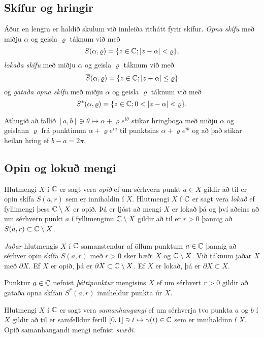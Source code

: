 \subsection*{Skífur og hringir}

Áður en lengra er haldið skulum við innleiða rithátt fyrir skífur.  
{\it Opna skífu} með miðju $\alpha$ og geisla
$\varrho$ táknum við með
$$ S(\alpha,\varrho)={\{z\in {\mathbb C}; |z-\alpha|<\varrho\}}, $$
{\it lokaða skífu} með miðju $\alpha$ og geisla 
$\varrho$ táknum við með
$$ \overline S(\alpha,\varrho)={\{z\in {\mathbb C}; |z-\alpha|\leq\varrho\}} $$
og {\it gataða opna skífu} með miðju $\alpha$ og
geisla $\varrho$ táknum við með
$$ S^*(\alpha,\varrho)=\set{z\in \C; 0<|z-\alpha|<\varrho}. $$


Athugið að fallið $[a,b]\ni \theta\mapsto \alpha+\varrho e^{i\theta}$ stikar
hringboga með miðju $\alpha$ og geislann $\varrho$ frá punktinum
$\alpha+\varrho e^{ia}$
til punktsins $\alpha+\varrho e^{ib}$ og að það stikar heilan hring ef 
$b-a=2\pi$.

\subsection*{Opin og lokuð mengi}

Hlutmengi $X$ í ${\mathbb C}$ er sagt vera {\it opið} ef um sérhvern punkt $a\in X$
gildir að til er opin skífa $S(a,r)$ sem er innihaldin í $X$.
Hlutmengi  $X$ í ${\mathbb C}$ er sagt vera {\it lokað } ef fyllimengi þess
${\mathbb C}\setminus X$ er opið.  Þá er ljóst að mengi $X$ er lokað þá og því
aðeins að um sérhvern punkt $a$ í fyllimenginu ${\mathbb C}\setminus X$ gildir
að til er $r>0$ þannig að $S(a,r)\subset {\mathbb C}\setminus X$.  


{\it Jaðar} hlutmengis $X$ í ${\mathbb C}$ samanstendur af öllum punktum
$a\in {\mathbb C}$ þannig að sérhver opin skífa $S(a,r)$ með $r>0$ sker bæði
$X$ og ${\mathbb C}\setminus X$.  Við táknum jaðar $X$ með $\partial X$.  
Ef $X$ er opið, þá er $\partial X\subset {\mathbb C}\setminus X$.
Ef $X$ er lokað, þá er $\partial X\subset X$.   

Punktur $a\in {\mathbb C}$ nefnist {\it þéttipunktur} mengisins $X$ ef um
sérhvert $r>0$ gildir að gataða opna skífan $S^*(a,r)$ inniheldur
punkta úr $X$.  


Hlutmengi $X$ í ${\mathbb C}$ er sagt vera
{\it samanhangangi} ef um sérhverja tvo punkta $a$ og $b$ í 
$X$ gildir að til er samfelldur ferill  $[0,1]\ni t\mapsto \gamma(t)\in {\mathbb C}$ sem er
innihaldinn í $X$.   Opið samanhangandi mengi nefnist {\it svæði}.  


